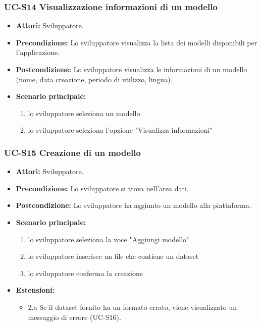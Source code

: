 	\subsubsection{UC-S14 Visualizzazione informazioni di un modello}
		\begin{itemize}
			\item \textbf{Attori:} Sviluppatore.
			\item \textbf{Precondizione:} Lo sviluppatore visualizza la lista dei modelli disponibili per l'applicazione.
			\item \textbf{Postcondizione:} Lo sviluppatore visualizza le informazioni di un modello (nome, data creazione, periodo di utilizzo, lingua).
			\item \textbf{Scenario principale:}
			\begin{enumerate}
				\item lo sviluppatore seleziona un modello
				\item lo sviluppatore seleziona l'opzione "Visualizza informazioni"
				\end{enumerate}
		\end{itemize}
		
	\subsubsection{UC-S15 Creazione di un modello}		
		\begin{itemize}
			\item \textbf{Attori:} Sviluppatore.
			\item \textbf{Precondizione:} Lo sviluppatore si trova nell'area dati.
			\item \textbf{Postcondizione:} Lo sviluppatore ha aggiunto un modello alla piattaforma.
			\item \textbf{Scenario principale:}
			\begin{enumerate}
				\item lo sviluppatore seleziona la voce "Aggiungi modello"
				\item lo sviluppatore inserisce un file che contiene un dataset
				\item lo sviluppatore conferma la creazione
			\end{enumerate}
			\item \textbf{Estensioni:}
				\begin{itemize}
					\item 2.a Se il dataset fornito ha un formato errato, viene visualizzato un messaggio di errore (UC-S16).
				\end{itemize}
		\end{itemize}
		
